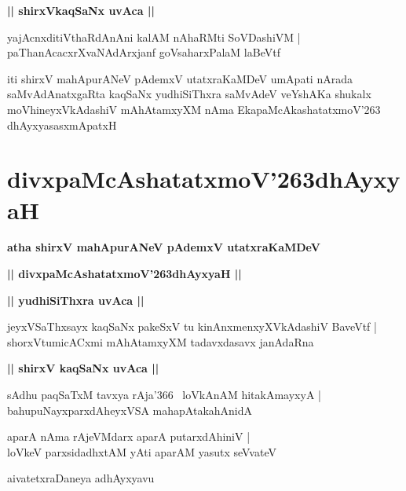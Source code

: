 \documentclass[twoside,12pt,openright]{book}
\def\S{\char'263}
\newcounter{shloka}[chapter]
\def\uvaca#1{\centerline{{\large\textbf{#1}}}}
\begin{document}
\uvaca{|| shirxVkaqSaNx uvAca ||}

\begin{shloka}%
yajAcnxditiVthaRdAnAni kalAM nAhaRMti SoVDashiVM |\\
paThanAcacxrXvaNAdArxjanf goVsaharxPalaM laBeVtf
\end{shloka}

\begin{center}
iti shirxV mahApurANeV pAdemxV utatxraKaMDeV umApati nArada saMvAdAnatxgaRta kaqSaNx yudhiSiThxra 
saMvAdeV veYshAKa shukalx moVhineyxVkAdashiV mAhAtamxyXM nAma EkapaMcAkashatatxmoV\S 
dhAyxyasasxmApatxH
\end{center}

\chapter{divxpaMcAshatatxmoV\S dhAyxyaH}

\begin{center}
{\LARGE\bfseries atha shirxV mahApurANeV pAdemxV utatxraKaMDeV}
\end{center}

\begin{center}
{\LARGE\bfseries || divxpaMcAshatatxmoV\S dhAyxyaH ||}
\end{center}

\uvaca{|| yudhiSiThxra uvAca ||}

\begin{shloka}%
jeyxVSaThxsayx kaqSaNx pakeSxV tu kinAnxmenxyXVkAdashiV BaveVtf |\\
shorxVtumicACxmi mAhAtamxyXM tadavxdasavx janAdaRna
\end{shloka}

\uvaca{|| shirxV kaqSaNx uvAca ||}

\begin{shloka}%
sAdhu paqSaTxM tavxya rAja\char'366 ~loVkAnAM  hitakAmayxyA |\\
bahupuNayxparxdAheyxVSA mahapAtakahAnidA
\end{shloka}

\begin{shloka}%
aparA nAma rAjeVMdarx aparA putarxdAhiniV |\\
loVkeV parxsidadhxtAM yAti aparAM yasutx seVvateV 
\end{shloka}

\begin{center}
aivatetxraDaneya adhAyxyavu
\end{center} 
 
\end{document}
